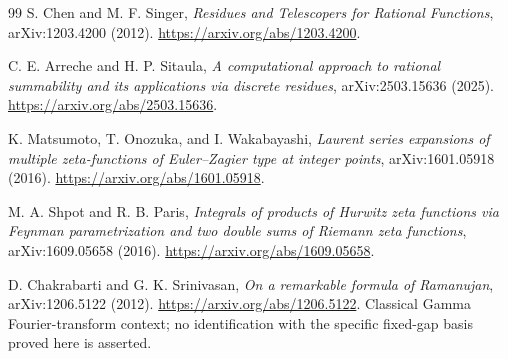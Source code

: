 \documentclass[11pt,a4paper]{article}
\numberwithin{equation}{section}
\theoremstyle{definition}
\theoremstyle{remark}
\begin{document}
\begin{thebibliography}{99}
S. Chen and M. F. Singer,
\emph{Residues and Telescopers for Rational Functions},
arXiv:1203.4200 (2012).
\url{https://arxiv.org/abs/1203.4200}.

C. E. Arreche and H. P. Sitaula,
\emph{A computational approach to rational summability and its
applications via discrete residues},
arXiv:2503.15636 (2025).
\url{https://arxiv.org/abs/2503.15636}.

K. Matsumoto, T. Onozuka, and I. Wakabayashi,
\emph{Laurent series expansions of multiple zeta-functions of
Euler--Zagier type at integer points},
arXiv:1601.05918 (2016).
\url{https://arxiv.org/abs/1601.05918}.

M. A. Shpot and R. B. Paris,
\emph{Integrals of products of Hurwitz zeta functions via Feynman
parametrization and two double sums of Riemann zeta functions},
arXiv:1609.05658 (2016).
\url{https://arxiv.org/abs/1609.05658}.

D. Chakrabarti and G. K. Srinivasan,
\emph{On a remarkable formula of Ramanujan},
arXiv:1206.5122 (2012).
\url{https://arxiv.org/abs/1206.5122}.
Classical Gamma Fourier-transform context; no identification with the
specific fixed-gap basis proved here is asserted.

\end{thebibliography}

\end{document}
